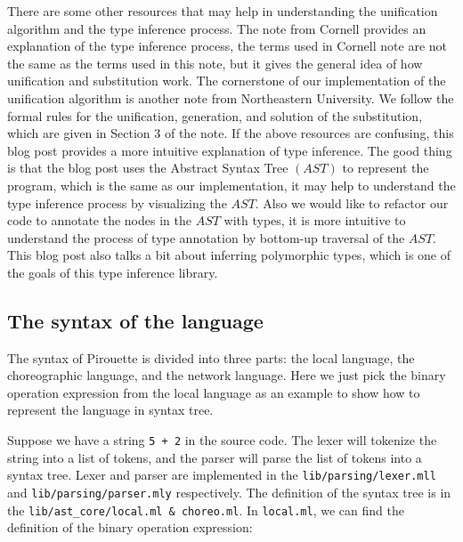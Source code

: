 \documentclass{article}
\begin{document}
    There are some other resources that may help in understanding the unification algorithm and the type inference process.
    The note from Cornell\cite{Cornell} provides an explanation of the type inference process,
    the terms used in Cornell note are not the same as the terms used in this note, but it gives the general idea of how unification and substitution work.
    The cornerstone of our implementation of the unification algorithm is another note from Northeastern University\cite{NEU2}.
    We follow the formal rules for the unification, generation, and solution of the substitution, which are given in Section 3 of the note.
    If the above resources are confusing, this blog post\cite{TypInferBlog} provides a more intuitive explanation of type inference.
    The good thing is that the blog post uses the Abstract Syntax Tree $(AST)$\cite{ASTBlog} to represent the program,
    which is the same as our implementation, it may help to understand the type inference process by visualizing the $AST$.
    Also we would like to refactor our code to annotate the nodes in the $AST$ with types, it is more intuitive to understand
    the process of type annotation by bottom-up traversal of the $AST$. This blog post also talks a bit about inferring polymorphic types,
    which is one of the goals of this type inference library.


\subsection{The syntax of the language}
    The syntax of Pirouette is divided into three parts: the local language, the choreographic language, and the network language.
    Here we just pick the binary operation expression from the local language as an example to show how to represent the language in syntax tree.

    Suppose we have a string \texttt{5 + 2} in the source code.
    The lexer will tokenize the string into a list of tokens, and the parser will parse the list of tokens into a syntax tree.
    Lexer and parser are implemented in the \texttt{lib/parsing/lexer.mll} and \texttt{lib/parsing/parser.mly} respectively.
    The definition of the syntax tree is in the \texttt{lib/ast\_core/local.ml \& choreo.ml}. In \texttt{local.ml},
    we can find the definition of the binary operation expression:

    \begin{center}
        \setlength{\fboxsep}{5pt}
    \end{center}
\end{document}

